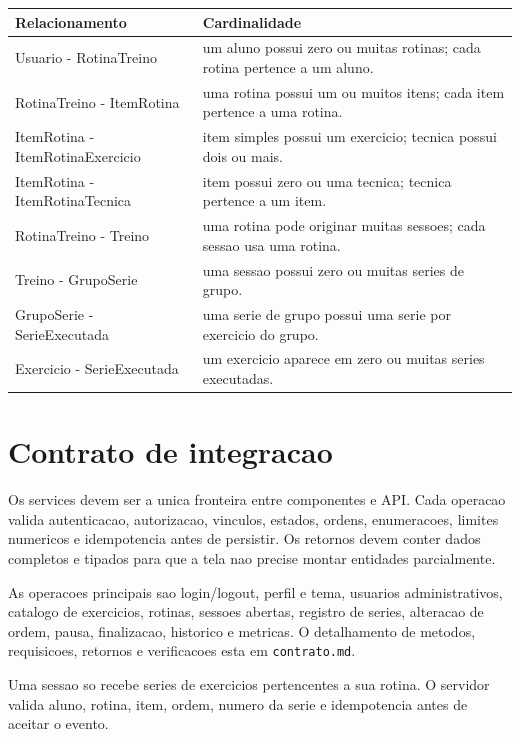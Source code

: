 \documentclass[12pt,a4paper]{article}
\begin{document}
\begin{longtable}{L{0.42\textwidth} L{0.44\textwidth}}
\toprule
Relacionamento & Cardinalidade \\
\midrule
Usuario - RotinaTreino & um aluno possui zero ou muitas rotinas; cada rotina pertence a um aluno. \\
RotinaTreino - ItemRotina & uma rotina possui um ou muitos itens; cada item pertence a uma rotina. \\
ItemRotina - ItemRotinaExercicio & item simples possui um exercicio; tecnica possui dois ou mais. \\
ItemRotina - ItemRotinaTecnica & item possui zero ou uma tecnica; tecnica pertence a um item. \\
RotinaTreino - Treino & uma rotina pode originar muitas sessoes; cada sessao usa uma rotina. \\
Treino - GrupoSerie & uma sessao possui zero ou muitas series de grupo. \\
GrupoSerie - SerieExecutada & uma serie de grupo possui uma serie por exercicio do grupo. \\
Exercicio - SerieExecutada & um exercicio aparece em zero ou muitas series executadas. \\
\bottomrule
\end{longtable}

\section{Contrato de integracao}

Os services devem ser a unica fronteira entre componentes e API. Cada operacao valida autenticacao, autorizacao, vinculos, estados, ordens, enumeracoes, limites numericos e idempotencia antes de persistir. Os retornos devem conter dados completos e tipados para que a tela nao precise montar entidades parcialmente.

As operacoes principais sao login/logout, perfil e tema, usuarios administrativos, catalogo de exercicios, rotinas, sessoes abertas, registro de series, alteracao de ordem, pausa, finalizacao, historico e metricas. O detalhamento de metodos, requisicoes, retornos e verificacoes esta em \texttt{contrato.md}.

\begin{regra}
Uma sessao so recebe series de exercicios pertencentes a sua rotina. O servidor valida aluno, rotina, item, ordem, numero da serie e idempotencia antes de aceitar o evento.
\end{regra}
\end{document}
